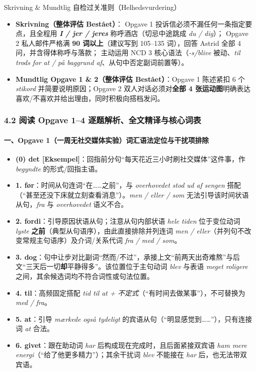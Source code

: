 \begin{tipbox}{Skrivning \& Mundtlig 自检过关准则（Helhedsvurdering）}
\small
\begin{itemize}
  \item \textbf{Skrivning（整体评估 Bestået）}： Opgave 1 投诉信必须不漏任何一条指定要点，且全程用 \textbf{\textit{I / jer / jeres}} 称呼酒店（切忌中途跳成 \textit{du / dig}）； Opgave 2 私人邮件严格满 \textbf{90 词以上}（建议写到 105--135 词），回答 Astrid 全部 4 问，并含得体称呼与落款； 主动运用 NCD 3 核心语法（\textit{-s/blive} 被动、\textit{til trods for at / på baggrund af}、从句中否定副词前置等）。
  \item \textbf{Mundtlig Opgave 1 \& 2（整体评估 Bestået）}：Opgave 1 陈述紧扣 6 个 \textit{stikord} 并简要说明原因；Opgave 2 双人对话必须对\textbf{全部 4 张运动图}明确表达喜欢/不喜欢并给出理由，同时积极向搭档发问。
\end{itemize}
\end{tipbox}

\subsubsection*{4.2 阅读 Opgave 1--4 逐题解析、全文精译与核心词表}

\paragraph*{一、Opgave 1（一周无社交媒体实验）词汇语法定位与干扰项排除}
\begin{itemize}
  \item \textbf{(0) det [Eksempel]}：回指前分句“每天花近三小时刷社交媒体”这件事，作 \textit{begyndte} 的形式/回指主语。
  \item \textbf{1. før}：时间从句连词“在……之前”，与 \textit{overhovedet stod ud af sengen} 搭配（“甚至还没下床就立刻查看消息”）。\textit{men / eller / som} 无法引导该时间状语从句，\textit{fra} 与 \textit{overhovedet} 语义不合。
  \item \textbf{2. fordi}：引导原因状语从句；注意从句内部状语 \textit{hele tiden} 位于变位动词 \textit{lyste} \textbf{之前}（典型从句语序），由此直接排除并列连词 \textit{men / eller}（并列句不改变常规主句语序）及介词/关系代词 \textit{fra / med / som}。
  \item \textbf{3. dog}：句中让步对比副词“然而/不过”，承接上文“前两天出奇难熬”与后文“三天后一切\textbf{却}平静得多”。该位置位于主句动词 \textit{blev} 与表语 \textit{meget roligere} 之间，其余候选词均不符合词性或句法位置。
  \item \textbf{4. til}：高频固定搭配 \textit{tid til at + 不定式}（“有时间去做某事”），不可替换为 \textit{med / fra}。
  \item \textbf{5. at}：引导 \textit{mærkede også tydeligt} 的宾语从句（“明显感觉到……”），只有连接词 \textit{at} 合法。
  \item \textbf{6. givet}：跟在助动词 \textit{har} 后构成现在完成时，且后面紧接双宾语 \textit{ham mere energi}（“给了他更多精力”）；其余干扰词 \textit{blev} 不能接在 \textit{har} 后，也无法带双宾语。
\end{itemize}

